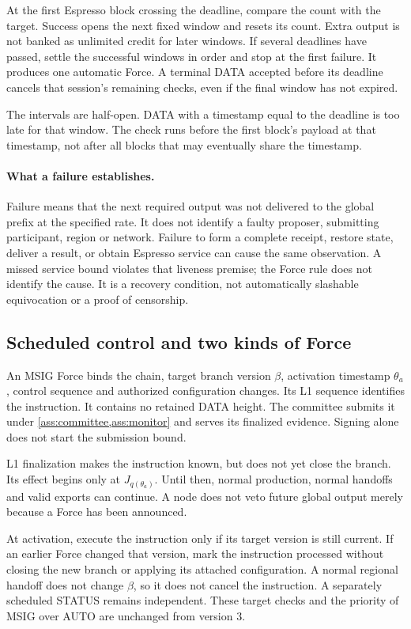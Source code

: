 \documentclass[11pt,a4paper]{article}
\begin{document}
At the first Espresso block crossing the deadline, compare the count
with the target. Success opens the next fixed window and resets its
count. Extra output is not banked as unlimited credit for later windows.
If several deadlines have passed, settle the successful windows in
order and stop at the first failure. It produces one automatic Force.
A terminal DATA accepted before its deadline cancels that session's
remaining checks, even if the final window has not expired.

The intervals are half-open. DATA with a timestamp equal to the
deadline is too late for that window. The check runs before the first
block's payload at that timestamp, not after all blocks that may
eventually share the timestamp.

\paragraph{What a failure establishes.}
Failure means that the next required output was not delivered to the
global prefix at the specified rate. It does not identify a faulty
proposer, submitting participant, region or network. Failure to form a
complete receipt, restore state, deliver a result, or obtain Espresso
service can cause the same observation. A missed service bound violates
that liveness premise; the Force rule does not identify the cause. It is a recovery condition,
not automatically slashable equivocation or a proof of censorship.

\subsection{Scheduled control and two kinds of Force}
\label{sec:force-stages}
An MSIG Force binds the chain, target branch version $\beta$, activation
timestamp $\theta_a$, control sequence and authorized configuration
changes. Its L1 sequence identifies the instruction. It contains no
retained DATA height. The committee submits it under
\cref{ass:committee,ass:monitor} and serves its finalized evidence.
Signing alone does not start the submission bound.

L1 finalization makes the instruction known, but does not yet close
the branch. Its effect begins only at $J_{q(\theta_a)}$.
Until then, normal production, normal handoffs and valid exports can
continue. A node does not veto future global output merely because a
Force has been announced.

At activation, execute the instruction only if its target version is
still current. If an earlier Force changed that version, mark the
instruction processed without closing the new branch or applying its
attached configuration. A normal regional handoff does not change
$\beta$, so it does not cancel the instruction. A separately scheduled
STATUS remains independent. These target checks and the priority of
MSIG over AUTO are unchanged from version 3.
\end{document}
